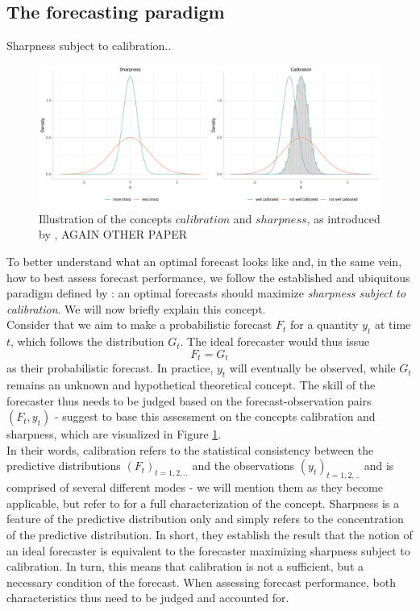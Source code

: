 \subsection{The forecasting paradigm}
Sharpness subject to calibration.\cite{ray_ensemble_2020}.
\begin{figure}
\centering
\includegraphics[width = \textwidth]{../plots/sharp_calib.pdf}
\caption{Illustration of the concepts $calibration$ and $sharpness$, as introduced by \cite{gneiting_strictly_2007}, AGAIN OTHER PAPER}
\label{fig:sharpcalib}
\end{figure}
To better understand what an optimal forecast looks like and, in the same vein, how to best assess forecast performance, we follow the established and ubiquitous paradigm defined by \cite{gneiting_probabilistic_2007}: an optimal forecasts should maximize \textit{sharpness subject to calibration}. We will now briefly explain this concept.\\
Consider that we aim to make a probabilistic forecast $F_t$ for a quantity $y_t$ at time $t$, which follows the distribution $G_t$. The ideal forecaster would thus issue 
\begin{equation}
	F_t = G_t
\end{equation}
as their probabilistic forecast. In practice, $y_t$ will eventually be observed, while $G_t$ remains an unknown and hypothetical theoretical concept. The skill of the forecaster thus needs to be judged based on the forecast-observation pairs $(F_t, y_t)$ - \cite{gneiting_probabilistic_2007} suggest to base this assessment on the concepts calibration and sharpness, which are visualized in Figure \ref{fig:sharpcalib}. \\
In their words, calibration refers to the statistical consistency between the predictive distributions $(F_t)_{t = 1,2,..}$ and the observations $(y_t)_{t = 1,2,..}$ and is comprised of several different modes - we will mention them as they become applicable, but refer to \cite{gneiting_probabilistic_2007} for a full characterization of the concept. %
Sharpness is a feature of the predictive distribution only and simply refers to the concentration of the predictive distribution. In short, they establish the result that the notion of an ideal forecaster is equivalent to the forecaster maximizing sharpness subject to calibration. In turn, this means that calibration is not a sufficient, but a necessary condition of the forecast. When assessing forecast performance, both characteristics thus need to be judged and accounted for.\\

